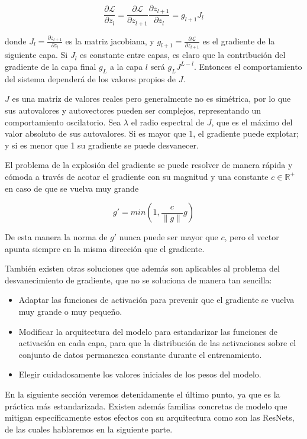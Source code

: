 $$\frac{\partial \mathcal{L}}{\partial z_l} = \frac{\partial \mathcal{L}}{\partial z_{l+1}} \frac{\partial z_{l+1}}{\partial z_l} = g_{l+1} J_l$$

donde $J_l = \frac{\partial z_{l+1}}{\partial z_l}$ es la matriz jacobiana, y $g_{l+1} = \frac{\partial \mathcal{L}}{\partial z_{l+1}}$ es el gradiente de la siguiente capa. Si $J_l$ es constante entre capas, es claro que la contribución del gradiente de la capa final $g_L$ a la capa $l$ será $ g_L J^{L-l}$. Entonces el comportamiento del sistema dependerá de los valores propios de $J$. %

$J$ es una matriz de valores reales pero generalmente no es simétrica, por lo que sus autovalores y autovectores pueden ser complejos, representando un comportamiento oscilatorio. Sea $\lambda$ el radio espectral de $J$, que es el máximo del valor absoluto de sus autovalores. Si es mayor que 1, el gradiente puede explotar; y si es menor que 1 su gradiente se puede desvanecer. 

El problema de la explosión del gradiente se puede resolver de manera rápida y cómoda a través de acotar el gradiente con su magnitud y una constante $c \in \mathbb{R}^+$ en caso de que se vuelva muy grande

$$g' = min(1, \frac{c}{\|g\|}g)$$

De esta manera la norma de $g'$ nunca puede ser mayor que $c$, pero el vector apunta siempre en la misma dirección que el gradiente.

También existen otras soluciones que además son aplicables al problema del desvanecimiento de gradiente, que no se soluciona de manera tan sencilla:

\begin{itemize}
    \item Adaptar las funciones de activación para prevenir que el gradiente se vuelva muy grande o muy pequeño.

    \item Modificar la arquitectura del modelo para estandarizar las funciones de activación en cada capa, para que la distribución de las activaciones sobre el conjunto de datos permanezca constante durante el entrenamiento.

    \item Elegir cuidadosamente los valores iniciales de los pesos del modelo.
   
\end{itemize}

En la siguiente sección veremos detenidamente el último punto, ya que es la práctica más estandarizada. Existen además familias concretas de modelo que mitigan específicamente estos efectos con su arquitectura como son las ResNets, de las cuales hablaremos en la siguiente parte.


